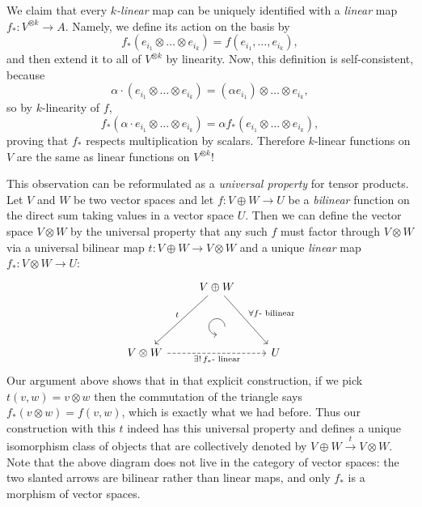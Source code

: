 \begin{example}
We claim that every \emph{$k$-linear} map can be uniquely identified
with a \emph{linear} map $f_{\ast}:V^{\otimes k}\to A$. Namely,
we define its action on the basis by
\begin{equation}
f_{\ast}\left(e_{i_{1}}\otimes\ldots\otimes e_{i_{k}}\right)=f\left(e_{i_{1}},\ldots,e_{i_{k}}\right),
\end{equation}
and then extend it to all of $V^{\otimes k}$ by linearity. Now, this
definition is self-consistent, because
\begin{equation}
\alpha\cdot\left(e_{i_{1}}\otimes\ldots\otimes e_{i_{k}}\right)=\left(\alpha e_{i_{1}}\right)\otimes\ldots\otimes e_{i_{k}},
\end{equation}
so by $k$-linearity of $f$, 
\[
f_{\ast}\left(\alpha\cdot e_{i_{1}}\otimes\ldots\otimes e_{i_{k}}\right)=\alpha f_{\ast}\left(e_{i_{1}}\otimes\ldots\otimes e_{i_{k}}\right),
\]
proving that $f_{\ast}$ respects multiplication by scalars. Therefore
$k$-linear functions on $V$ are the same as linear functions on
$V^{\otimes k}$! 

This observation can be reformulated as a \emph{universal property} for tensor products. Let $V$ and $W$ be two vector spaces and let $f:V\oplus W\to U$ be a \emph{bilinear} function on the direct sum taking values in a vector space $U$. Then we can define the vector space $V\otimes W$ by the universal property that any such $f$ must factor through $V\otimes W$ via a universal bilinear map $t:V\oplus W\to V\otimes W$ and a unique \emph{linear} map $f_\ast:V\otimes W\to U$:
\[\begin{tikzcd}[every matrix/.append style={name=m},   
execute at end picture={\draw [<-] ([xshift=0mm,yshift=-6mm]m-2-2.north) arc[start angle=-90,delta angle=-270,radius=0.25cm];}]
   & V\oplus W\arrow[ddl,swap,"t" ]\arrow[ddr,"\forall f\text{- bilinear}"] & \\
   & \, & \\
   V\otimes W \arrow[rr,dashed,swap,"\exists!\,f_\ast\text{- linear}"]& & U
\end{tikzcd}\]
Our argument above shows that in that explicit construction, if we pick $t(v,w)=v\otimes w$ then the commutation of the triangle says $f_\ast (v\otimes w)=f(v,w)$, which is exactly what we had before. Thus our construction with this $t$ indeed has this universal property and defines a unique isomorphism class of objects that are collectively denoted by  $V\oplus W\overset{t}{\to}V\otimes W $. Note that the above diagram does not live in the category of vector spaces: the two slanted arrows are bilinear rather than linear maps, and only $f_\ast$ is a morphism of vector spaces.


\end{example}
